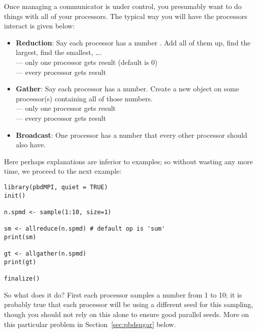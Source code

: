Once managing a communicator is under control, you presumably want to do
things with all of your processors. The typical way you will have the
processors interact is given below:

\begin{itemize}
  \item \textbf{Reduction}: Say each processor has a number .
        Add all of them up, find the largest, find the smallest, \dots .\\
         ---
        only one processor gets result (default is 0)\\
         ---
        every processor gets result
  \item \textbf{Gather}: Say each processor has a number.
        Create a new object on some processor(s) containing all of
        those numbers.\\
         ---
        only one processor gets result\\
         ---
          every processor gets result
  \item \textbf{Broadcast}: One processor has a number  that
        every other processor should also have.\\
\end{itemize}

Here perhaps explanations are inferior to examples; so without wasting any
more time, we proceed to the next example:

\begin{lstlisting}[language=rr,title=Simple pbdMPI Example 2]
library(pbdMPI, quiet = TRUE)
init()

n.spmd <- sample(1:10, size=1)

sm <- allreduce(n.spmd) # default op is 'sum'
print(sm)

gt <- allgather(n.spmd)
print(gt)

finalize()
\end{lstlisting}

So what does it do? First each processor samples a number from 1 to 10;
it is probably true that each processor will be using a different seed
for this sampling, though you should not rely on this alone to ensure
good parallel seeds. More on this particular problem in
Section~\ref{sec:pbdsugar} below.

